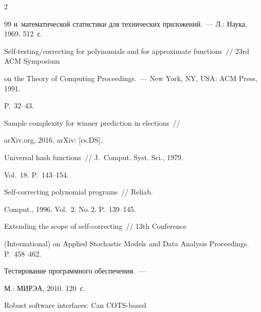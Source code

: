 \begin{multicols}{2}
{{\begin{thebibliography}{99}
и~математической статистики для технических приложений.~--- Л.: Наука, 1969. 512~с.


     






Self-testing/correcting for polynomials and for approximate functions~// 23rd ACM Symposium 


on the Theory of Computing Proceedings.~--- New York, NY, USA: ACM Press, 1991.  


P.~32--43.







      Sample complexity for winner prediction in elections~// 


arXiv.org, 2016. \mbox{arXiv}: [cs.DS]. 


    


    




      Universal hash functions~// J.~Comput. Syst. Sci., 1979. 


Vol.~18. P.~143--154.







      Self-correcting polynomial programs~// Reliab. 


Comput., 1996. Vol.~2. No.\,2. P.~139--145.




      Extending the scope of self-correcting~// 13th Conference 


(International) on Applied Stochastic Models and Data Analysis Proceedings. P.~458--462.




      Тестирование про\-грам\-мно\-го обеспечения.~--- 


М.: МИРЭА, 2010. 120~с.




      Robust software interfaces: Can COTS-based 



\end{thebibliography}}}
\end{multicols}
